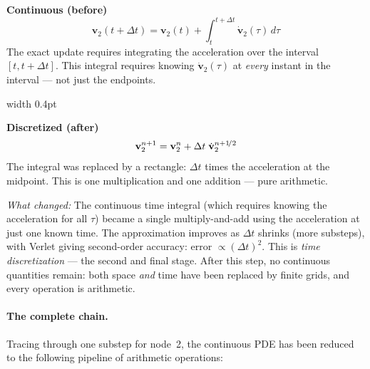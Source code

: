 \documentclass[11pt]{article}
\newcommand{\vect}[1]{\mathbf{#1}}
\begin{document}
\begin{tcolorbox}[colback=white, colframe=black!40, title={\small Step 5 --- Continuous vs.\ discretized time evolution}, fonttitle=\bfseries\small]
\begin{minipage}[t]{0.47\linewidth}
\centering\textbf{Continuous (before)}
\[
  \vect{v}_2(t + \Delta t) = \vect{v}_2(t) + \int_t^{t+\Delta t} \dot{\vect{v}}_2(\tau)\, d\tau
\]
The exact update requires integrating the acceleration over the interval $[t, t{+}\Delta t]$.
This integral requires knowing $\dot{\vect{v}}_2(\tau)$ at \emph{every} instant in the interval --- not just the endpoints.
\end{minipage}\hfill
\vrule width 0.4pt\hfill
\begin{minipage}[t]{0.47\linewidth}
\centering\textbf{Discretized (after)}
\[
  \vect{v}_2^{n+1} = \vect{v}_2^n + \Delta t\; \dot{\vect{v}}_2^{n+\smash{1\!/2}}
\]
The integral was replaced by a rectangle: $\Delta t$ times the acceleration at the midpoint.
This is one multiplication and one addition --- pure arithmetic.
\end{minipage}

\smallskip
\noindent\textit{What changed:} The continuous time integral (which requires knowing the acceleration for all $\tau$) became a single multiply-and-add using the acceleration at just one known time.
The approximation improves as $\Delta t$ shrinks (more substeps), with Verlet giving second-order accuracy: error $\propto (\Delta t)^2$.
This is \emph{time discretization} --- the second and final stage.
After this step, no continuous quantities remain: both space \emph{and} time have been replaced by finite grids, and every operation is arithmetic.
\end{tcolorbox}

\paragraph{The complete chain.}
Tracing through one substep for node~2, the continuous PDE has been reduced to the following pipeline of arithmetic operations:
\end{document}
